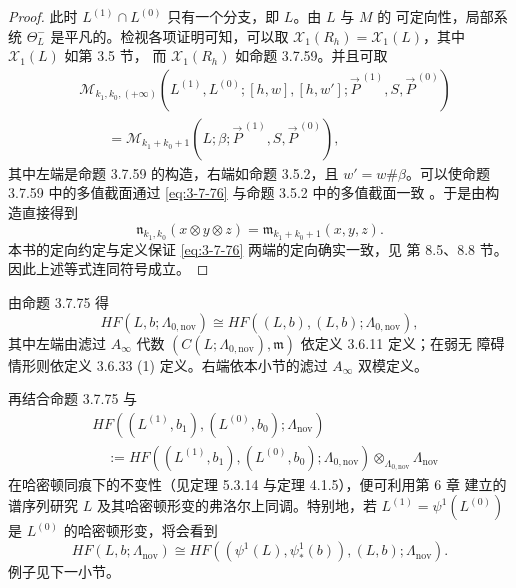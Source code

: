 \begin{proof}
此时 $L^{(1)}\cap L^{(0)}$ 只有一个分支，即 $L$。由 $L$ 与 $M$ 的
可定向性，局部系统 $\Theta^-_L$ 是平凡的。检视各项证明可知，可以取
$\mathcal X_1(R_h)=\mathcal X_1(L)$，其中 $\mathcal X_1(L)$ 如第 3.5 节，
而 $\mathcal X_1(R_h)$ 如命题 3.7.59。并且可取
\begin{equation}
\begin{aligned}
 &\mathcal M_{k_1,k_0,(+\infty)}
 (L^{(1)},L^{(0)};[h,w],[h,w'];
 \vec P^{\,(1)},S,\vec P^{\,(0)})\\
 &\qquad=
 \mathcal M_{k_1+k_0+1}
 (L;\beta;\vec P^{\,(1)},S,\vec P^{\,(0)}),
\end{aligned}
\tag{3.7.76}\label{eq:3-7-76}
\end{equation}
其中左端是命题 3.7.59 的构造，右端如命题 3.5.2，且
$w'=w\#\beta$。可以使命题 3.7.59 中的多值截面通过
\eqref{eq:3-7-76} 与命题 3.5.2 中的多值截面一致
。于是由构造直接得到
\[
 \mathfrak n_{k_1,k_0}(x\otimes y\otimes z)
 =
 \mathfrak m_{k_1+k_0+1}(x,y,z).
\]
本书的定向约定与定义保证 \eqref{eq:3-7-76} 两端的定向确实一致，见
第 8.5、8.8 节。因此上述等式连同符号成立。
\end{proof}

由命题 3.7.75 得
\begin{equation}
 HF(L,b;\Lambda_{0,\mathrm{nov}})
 \cong
 HF((L,b),(L,b);\Lambda_{0,\mathrm{nov}}),
\tag{3.7.77}\label{eq:3-7-77}
\end{equation}
其中左端由滤过 $A_\infty$ 代数
$(C(L;\Lambda_{0,\mathrm{nov}}),\mathfrak m)$ 依定义 3.6.11 定义；在弱无
障碍情形则依定义 3.6.33 (1) 定义。右端依本小节的滤过
$A_\infty$ 双模定义。

再结合命题 3.7.75 与
\[
\begin{aligned}
 &HF((L^{(1)},b_1),(L^{(0)},b_0);\Lambda_{\mathrm{nov}})\\
 &\quad:=
 HF((L^{(1)},b_1),(L^{(0)},b_0);\Lambda_{0,\mathrm{nov}})
 \otimes_{\Lambda_{0,\mathrm{nov}}}\Lambda_{\mathrm{nov}}
\end{aligned}
\]
在哈密顿同痕下的不变性（见定理 5.3.14 与定理 4.1.5），便可利用第 6 章
建立的谱序列研究 $L$ 及其哈密顿形变的弗洛尔上同调。特别地，若
$L^{(1)}=\psi^1(L^{(0)})$ 是 $L^{(0)}$ 的哈密顿形变，将会看到
\begin{equation}
 HF(L,b;\Lambda_{\mathrm{nov}})
 \cong
 HF((\psi^1(L),\psi^1_*(b)),(L,b);\Lambda_{\mathrm{nov}}).
\tag{3.7.78}\label{eq:3-7-78}
\end{equation}
例子见下一小节。
